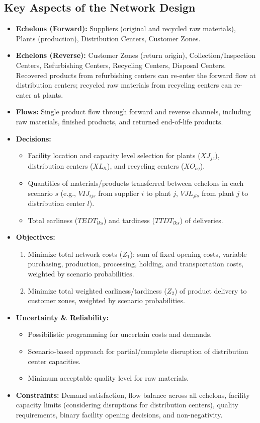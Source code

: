 \subsection*{Key Aspects of the Network Design}
\begin{itemize}
    \item \textbf{Echelons (Forward):} Suppliers (original and recycled raw materials), Plants (production), Distribution Centers, Customer Zones.
    \item \textbf{Echelons (Reverse):} Customer Zones (return origin), Collection/Inspection Centers, Refurbishing Centers, Recycling Centers, Disposal Centers. Recovered products from refurbishing centers can re-enter the forward flow at distribution centers; recycled raw materials from recycling centers can re-enter at plants.
    \item \textbf{Flows:} Single product flow through forward and reverse channels, including raw materials, finished products, and returned end-of-life products.
    \item \textbf{Decisions:}
        \begin{itemize}
            \item Facility location and capacity level selection for plants ($XJ_{jz}$), distribution centers ($XL_{lt}$), and recycling centers ($XO_{oq}$).
            \item Quantities of materials/products transferred between echelons in each scenario $s$ (e.g., $VIJ_{ijs}$ from supplier $i$ to plant $j$, $VJL_{jls}$ from plant $j$ to distribution center $l$).
            \item Total earliness ($TEDT_{lks}$) and tardiness ($TTDT_{lks}$) of deliveries.
        \end{itemize}
    \item \textbf{Objectives:}
        \begin{enumerate}
            \item Minimize total network costs ($Z_1$): sum of fixed opening costs, variable purchasing, production, processing, holding, and transportation costs, weighted by scenario probabilities.
            \item Minimize total weighted earliness/tardiness ($Z_2$) of product delivery to customer zones, weighted by scenario probabilities.
        \end{enumerate}
    \item \textbf{Uncertainty \& Reliability:}
        \begin{itemize}
            \item Possibilistic programming for uncertain costs and demands.
            \item Scenario-based approach for partial/complete disruption of distribution center capacities.
            \item Minimum acceptable quality level for raw materials.
        \end{itemize}
    \item \textbf{Constraints:} Demand satisfaction, flow balance across all echelons, facility capacity limits (considering disruptions for distribution centers), quality requirements, binary facility opening decisions, and non-negativity.
\end{itemize}

